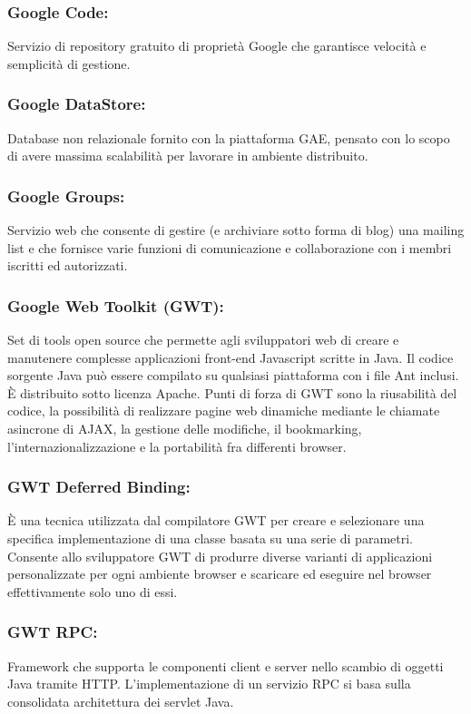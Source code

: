 \subsubsection*{Google Code:} Servizio di repository gratuito di
propriet\`a Google che garantisce velocit\`a e semplicit\`a di gestione.

\subsubsection*{Google DataStore:} Database non relazionale fornito con la
piattaforma GAE, pensato con lo scopo di avere massima scalabilit\`a per
lavorare in ambiente distribuito.

\subsubsection*{Google Groups:} Servizio web che consente di gestire (e
archiviare sotto forma di blog) una mailing list e che fornisce varie funzioni
di comunicazione e collaborazione con i membri iscritti ed autorizzati.

\subsubsection*{Google Web Toolkit (GWT):} Set di tools open source che
permette agli sviluppatori web di creare e manutenere complesse applicazioni front-end
Javascript scritte in Java. Il codice sorgente Java pu\`o essere compilato su
qualsiasi piattaforma con i file Ant inclusi. \`E distribuito sotto licenza
Apache. Punti di forza di GWT sono la riusabilit\`a del codice, la possibilit\`a di
realizzare pagine web dinamiche mediante le chiamate asincrone di AJAX, la
gestione delle modifiche, il bookmarking, l'internazionalizzazione e la
portabilit\`a fra differenti browser.

\subsubsection*{GWT Deferred Binding:}
\`E una tecnica utilizzata dal compilatore GWT per creare e selezionare una
specifica implementazione di una classe basata su una serie di parametri.
Consente allo sviluppatore GWT di produrre diverse varianti di
applicazioni personalizzate per ogni ambiente browser e scaricare ed eseguire
nel browser effettivamente solo uno di essi.

\subsubsection*{GWT RPC:}
Framework che supporta le componenti client e server nello scambio di
oggetti Java tramite HTTP. L'implementazione di un servizio RPC si basa sulla
consolidata architettura dei servlet Java.

